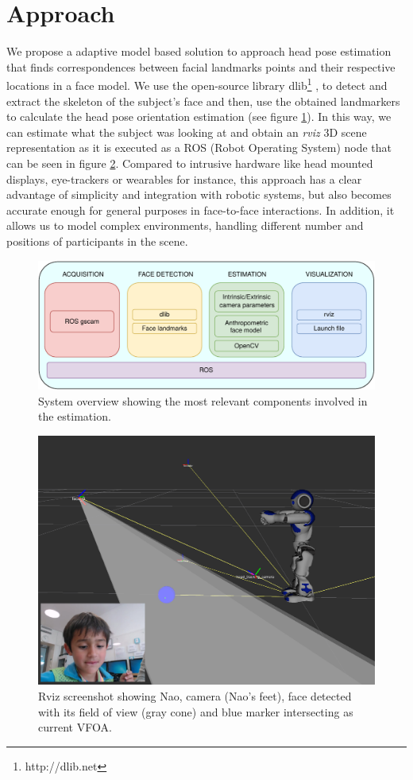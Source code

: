 \documentclass{sig-alternate}
\begin{document}
\section{Approach}

We propose a adaptive model based solution to approach head pose estimation that finds correspondences between facial landmarks points and their respective locations in a face model. We use the open-source library dlib\footnote{http://dlib.net} \cite{dlib09}, to detect and extract the skeleton of the subject's face and then, use the obtained landmarkers to calculate the head pose orientation estimation (see figure \ref{system}). In this way, we can estimate what the subject was looking at and obtain an \textit{rviz} 3D scene representation as it is executed as a ROS (Robot Operating System) node that can be seen in figure \ref{rviz}. Compared to intrusive hardware like head mounted displays, eye-trackers or wearables for instance, this approach has a clear advantage of simplicity and integration with robotic systems, but also becomes accurate enough for general purposes in face-to-face interactions. In addition, it allows us to model complex environments, handling different number and positions of participants in the scene.

\begin{figure}[h!]
    \centering
    \includegraphics[width=0.9\columnwidth]{system}
    \caption{\small System overview showing the most relevant components involved in the estimation.}
    \label{system}
\end{figure}


\begin{figure}
    \centering
    \includegraphics[width=0.9\columnwidth]{rviz_camera}
    \caption{\small Rviz screenshot showing Nao, camera (Nao's feet), face detected with its field of view (gray cone) and blue marker intersecting as current VFOA.}
    \label{rviz}
\end{figure}
\end{document}
